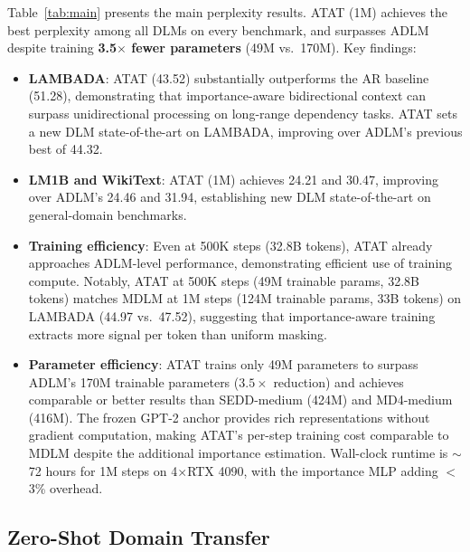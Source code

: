 \documentclass[11pt]{article}
\theoremstyle{remark}
\begin{document}
Table~\ref{tab:main} presents the main perplexity results. ATAT (1M) achieves the best perplexity among all DLMs on every benchmark, and surpasses ADLM despite training \textbf{3.5$\times$ fewer parameters} (49M vs.\ 170M). Key findings:

\begin{itemize}[leftmargin=*,itemsep=1pt,topsep=2pt]
    \item \textbf{LAMBADA}: ATAT (43.52) substantially outperforms the AR baseline (51.28), demonstrating that importance-aware bidirectional context can surpass unidirectional processing on long-range dependency tasks. ATAT sets a new DLM state-of-the-art on LAMBADA, improving over ADLM's previous best of 44.32.
    \item \textbf{LM1B and WikiText}: ATAT (1M) achieves 24.21 and 30.47, improving over ADLM's 24.46 and 31.94, establishing new DLM state-of-the-art on general-domain benchmarks.
    \item \textbf{Training efficiency}: Even at 500K steps (32.8B tokens), ATAT already approaches ADLM-level performance, demonstrating efficient use of training compute. Notably, ATAT at 500K steps (49M trainable params, 32.8B tokens) matches MDLM at 1M steps (124M trainable params, 33B tokens) on LAMBADA (44.97 vs.\ 47.52), suggesting that importance-aware training extracts more signal per token than uniform masking.
    \item \textbf{Parameter efficiency}: ATAT trains only 49M parameters to surpass ADLM's 170M trainable parameters ($3.5\times$ reduction) and achieves comparable or better results than SEDD-medium (424M) and MD4-medium~\citep{shi2024simplified} (416M). The frozen GPT-2 anchor provides rich representations without gradient computation, making ATAT's per-step training cost comparable to MDLM despite the additional importance estimation. Wall-clock runtime is $\sim$72 hours for 1M steps on 4$\times$RTX 4090, with the importance MLP adding $<$3\% overhead.
\end{itemize}

\subsection{Zero-Shot Domain Transfer}
\end{document}
